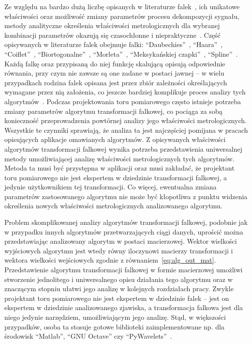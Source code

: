 Ze względu na bardzo dużą liczbę opisanych w literaturze falek~\cite{akujuobi_applications}, ich unikatowe właściwości oraz możliwość zmiany parametrów procesu dekompozycji sygnału, metody analityczne określenia właściwości metrologicznych dla wybranej kombinacji parametrów okazują się czasochłonne i niepraktyczne~\cite{yan_uncertainty, wilczok_uncertainty, peretto_uncertainty, sarrafi_uncertainty}. Część opisywanych w literaturze falek obejmuje falki: \enquote{Daubechies}~\cite{vonesch_dbbasics}, \enquote{Haara}~\cite{stankovic_haar}, \enquote{Coiflet}~\cite{wei_coiflet}, \enquote{Biortogonalne}~\cite{sweldens_bior}, \enquote{Morleta}~\cite{cohen_morlet}, \enquote{Meksykańskiej czapki}~\cite{singh_mexican}, \enquote{Spline}~\cite{averbuch_spline, wang_splinebasics}. Każdą falkę oraz przypisaną do niej funkcję skalującą opisują odpowiednie równania, przy czym nie zawsze są one zadane w postaci jawnej -- w wielu przypadkach rodzina falek opisana jest przez zbiór zależności określających wymagane przez nią założenia, co jeszcze bardziej komplikuje proces analizy tych algorytmów~\cite{rowe_dbmath}. Podczas projektowania toru pomiarowego często istnieje potrzeba zmiany parametrów algorytmu transformacji falkowej, co pociąga za sobą konieczność przeprowadzenia powtórnej analizy jego właściwości metrologicznych. Wszystkie te czynniki sprawiają, że analiza ta jest najczęściej pomijana w pracach opisujących aplikacje omawianych algorytmów. Z opisywanych właściwości algorytmów transformacji falkowej wynika potrzeba przedstawienia uniwersalnej metody umożliwiającej analizę właściwości metrologicznych tych algorytmów. Metoda ta musi być przystępna w aplikacji oraz musi zakładać, że projektant toru pomiarowego nie jest ekspertem w dziedzinie transformacji falkowej, a jedynie użytkownikiem tej transformacji. Co więcej, ewentualna zmiana parametrów zastosowanego algorytmu nie może być kłopotliwa z punktu widzenia określenia nowych właściwości metrologicznych analizowanego algorytmu.

Problem skomplikowanej analizy algorytmów transformacji falkowej, podobnie jak w przypadku innych algorytmów przetwarzających ciągi danych, uprościć można przedstawiając analizowany algorytm w postaci macierzowej. Wektor wielkości wyjściowych algorytmu jest wtedy równy iloczynowi macierzy transformacji i wektora wielkości wejściowych zgodnie z równaniem~\eqref{eq:alg_out_mat}. Przedstawienie algorytmu transformacji falkowej w formie macierzowej umożliwi stworzenie jednolitego i uniwersalnego opisu działania tego algorytmu oraz w znaczącym stopniu ułatwi jego analizę w kolejnych rozdziałach pracy. Zwykle projektant toru pomiarowego nie jest ekspertem w dziedzinie falek -- jest on ekspertem w dziedzinie analizowanego zjawiska, a transformacja falkowa jest dla niego jedynie narzędziem, umożliwiającym jego analizę. Stąd, w większości przypadków, osoba ta stosuje gotowe biblioteki zaimplementowane np. dla środowisk \enquote{Matlab}, \enquote{GNU Octave} czy \enquote{PyWavelets}~\cite{lee_pywavelets, misiti_matlabwav}.

